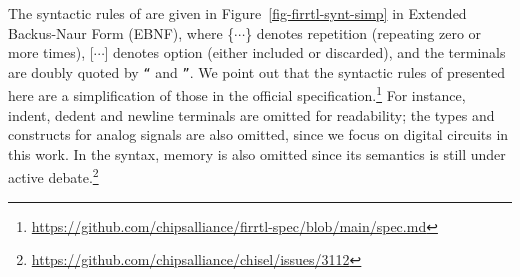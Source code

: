 The syntactic rules of {\firrtl} are given in Figure~\ref{fig-firrtl-synt-simp} in Extended Backus-Naur Form (EBNF), where \{$\cdots$\} denotes repetition (repeating zero or more times),
[$\cdots$] denotes option (either included or discarded),  and the terminals are doubly quoted by \mbox{\tt ``} and \mbox{\tt ''}.
We point out that the syntactic rules of {\firrtl}  presented here are a simplification of those in the official specification.\footnote{\url{https://github.com/chipsalliance/firrtl-spec/blob/main/spec.md}}
%
For instance, indent, dedent and newline terminals are omitted for readability;
the types and constructs for analog signals are also omitted, since we focus on digital circuits in this work.
In the syntax, memory is also omitted since its semantics is still under active debate.\footnote{\url{https://github.com/chipsalliance/chisel/issues/3112}}


